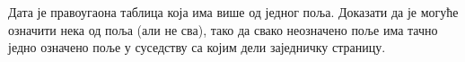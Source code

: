 \problem
Дата је правоугаона таблица која има више од једног поља. 
Доказати да је могуће означити нека од поља (али не сва), тако да свако
неозначено поље има тачно једно означено поље у суседству са којим дели
заједничку страницу. 

\solution

\endproblem
